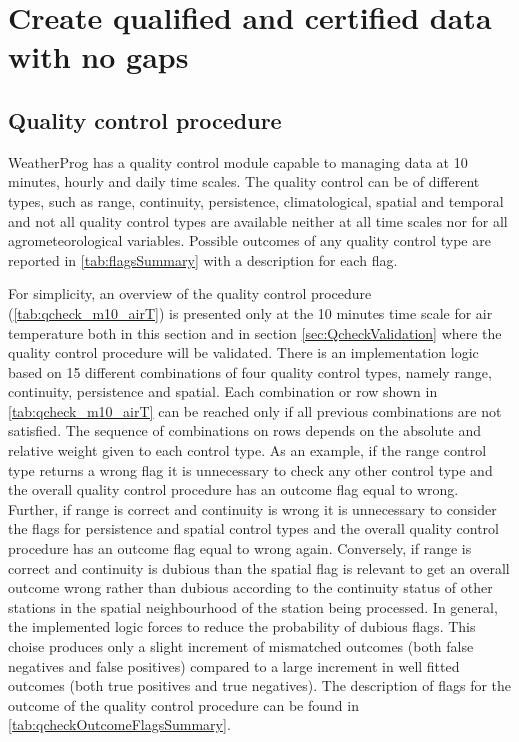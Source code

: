 \documentclass[authoryear,preprint,review,12pt]{elsarticle}
\newcommand{\note}[1]{\emph{\textcolor{red}{#1}}}
\begin{document}
\section{Create qualified and certified data with no gaps}

\subsection{Quality control procedure} \label{sec:qcheck}
WeatherProg has a quality control module capable to managing data at 10 minutes, hourly and daily time scales.
The quality control can be of different types, such as range, continuity, persistence, climatological, spatial and temporal and not all quality control types are available neither at all time scales nor for all agrometeorological variables.
Possible outcomes of any quality control type are reported in \cref{tab:flagsSummary} with a description for each flag.

For simplicity, an overview of the quality control procedure (\cref{tab:qcheck_m10_airT}) is presented only at the 10 minutes time scale for air temperature both in this section and in section \ref{sec:QcheckValidation} where the quality control procedure will be validated.
There is an implementation logic based on 15 different combinations of four quality control types, namely range, continuity, persistence and spatial.
Each combination or row shown in \cref{tab:qcheck_m10_airT} can be reached only if all previous combinations are not satisfied.
The sequence of combinations on rows depends on the absolute and relative weight given to each control type.
As an example, if the range control type returns a wrong flag it is unnecessary to check any other control type and the overall quality control procedure has an outcome flag equal to wrong.
Further, if range is correct and continuity is wrong it is unnecessary to consider the flags for persistence and spatial control types and the overall quality control procedure has an outcome flag equal to wrong again.
Conversely, if range is correct and continuity is dubious than the spatial flag is relevant to get an overall outcome wrong rather than dubious according to the continuity status of other stations in the spatial neighbourhood of the station being processed.
In general, the implemented logic forces to reduce the probability of dubious flags.
This choise produces only a slight increment of mismatched outcomes (both false negatives and false positives) compared to a large increment in well fitted outcomes (both true positives and true negatives).
The description of flags for the outcome of the quality control procedure can be found in \cref{tab:qcheckOutcomeFlagsSummary}.
\end{document}
